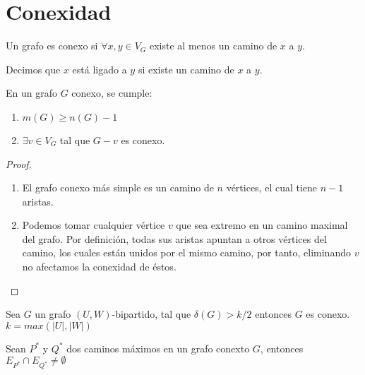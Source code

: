 \section{Conexidad}

\begin{definicion}
\label{"grafo conexo"}
Un grafo es conexo si $\forall x,y\in V_G$ existe al menos un camino de $x$ a $y$.
\end{definicion}

Decimos que $x$ está ligado a $y$ si existe un camino de $x$ a $y$.

\begin{teorema}
\label{teoconex}
En un grafo $G$ conexo, se cumple:
\begin{enumerate}
\item $m(G)\ge n(G)-1$
\item $\exists v \in V_G$ tal que $G-v$ es conexo.
\end{enumerate}
\end{teorema}

\begin{proof}
\begin{enumerate}
\item El grafo conexo más simple es un camino de $n$ vértices, el cual tiene $n-1$ aristas.
\item Podemos tomar cualquier vértice $v$ que sea extremo en un camino maximal del grafo.
Por definición, todas sus aristas apuntan a otros vértices del camino, los cuales están unidos por el mismo camino, por tanto, eliminando $v$ no afectamos la conexidad de éstos.
\end{enumerate}
\end{proof}

\begin{teorema}
Sea $G$ un grafo $(U,W)$-bipartido, tal que $\delta(G)>k/2$ entonces $G$ es conexo. $k=max(|U|,|W|)$
\end{teorema}


\begin{teorema}
Sean $P^*$ y $Q^*$ dos caminos máximos en un grafo conexto $G$, entonces $E_{P^*} \cap E_{Q^*}\neq \emptyset$
\end{teorema}


